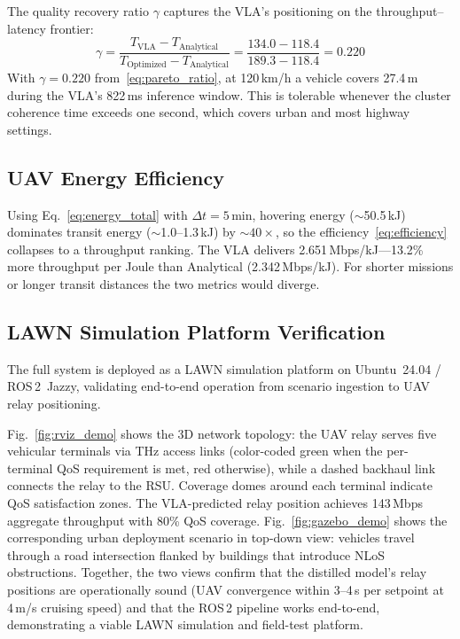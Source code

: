 \documentclass[journal]{IEEEtran}
\begin{document}
The quality recovery ratio $\gamma$ captures the VLA's positioning on the throughput--latency frontier:
\begin{equation}
    \gamma = \frac{T_\text{VLA} - T_\text{Analytical}}{T_\text{Optimized} - T_\text{Analytical}} = \frac{134.0 - 118.4}{189.3 - 118.4} = 0.220
    \label{eq:pareto_ratio}
\end{equation}
With $\gamma{=}0.220$ from~\eqref{eq:pareto_ratio}, at 120\,km/h a vehicle covers 27.4\,m during the VLA's 822\,ms inference window. This is tolerable whenever the cluster coherence time exceeds one second, which covers urban and most highway settings.


\subsection{UAV Energy Efficiency}
\label{sec:energy}

Using Eq.~\eqref{eq:energy_total} with $\Delta t = 5$\,min, hovering energy (${\sim}$50.5\,kJ) dominates transit energy (${\sim}$1.0--1.3\,kJ) by ${\sim}40\times$, so the efficiency~\eqref{eq:efficiency} collapses to a throughput ranking. The VLA delivers 2.651\,Mbps/kJ---13.2\% more throughput per Joule than Analytical (2.342\,Mbps/kJ). For shorter missions or longer transit distances the two metrics would diverge.


\subsection{LAWN Simulation Platform Verification}
\label{sec:simulation}

The full system is deployed as a LAWN simulation platform on Ubuntu~24.04 / ROS\,2~Jazzy, validating end-to-end operation from scenario ingestion to UAV relay positioning.

Fig.~\ref{fig:rviz_demo} shows the 3D network topology: the UAV relay serves five vehicular terminals via THz access links (color-coded green when the per-terminal QoS requirement is met, red otherwise), while a dashed backhaul link connects the relay to the RSU. Coverage domes around each terminal indicate QoS satisfaction zones. The VLA-predicted relay position achieves 143\,Mbps aggregate throughput with 80\% QoS coverage. Fig.~\ref{fig:gazebo_demo} shows the corresponding urban deployment scenario in top-down view: vehicles travel through a road intersection flanked by buildings that introduce NLoS obstructions. Together, the two views confirm that the distilled model's relay positions are operationally sound (UAV convergence within 3--4\,s per setpoint at 4\,m/s cruising speed) and that the ROS\,2 pipeline works end-to-end, demonstrating a viable LAWN simulation and field-test platform.
\end{document}
